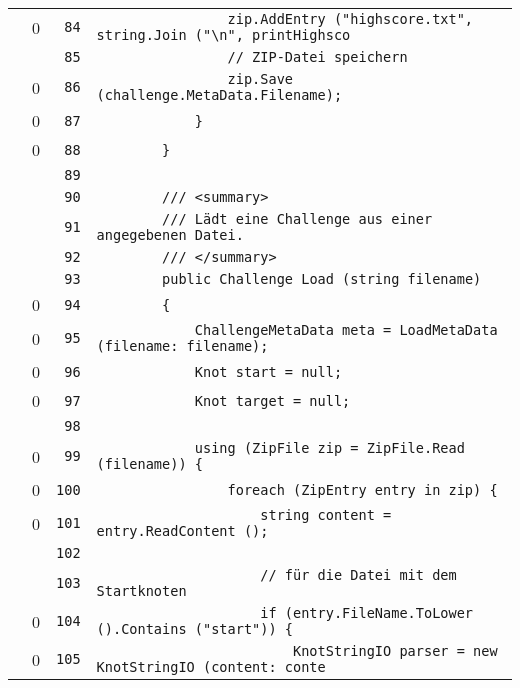 \documentclass[a4paper,10pt]{article}
\begin{document}
\begin{longtable}[l]{lrrl}
\cellcolor{red} & 0 & \verb~84~ & \verb~                zip.AddEntry ("highscore.txt", string.Join ("\n", printHighsco~\\
\cellcolor{gray} &  & \verb~85~ & \verb~                // ZIP-Datei speichern~\\
\cellcolor{red} & 0 & \verb~86~ & \verb~                zip.Save (challenge.MetaData.Filename);~\\
\cellcolor{red} & 0 & \verb~87~ & \verb~            }~\\
\cellcolor{red} & 0 & \verb~88~ & \verb~        }~\\
\cellcolor{gray} &  & \verb~89~ & \verb~~\\
\cellcolor{gray} &  & \verb~90~ & \verb~        /// <summary>~\\
\cellcolor{gray} &  & \verb~91~ & \verb~        /// Lädt eine Challenge aus einer angegebenen Datei.~\\
\cellcolor{gray} &  & \verb~92~ & \verb~        /// </summary>~\\
\cellcolor{gray} &  & \verb~93~ & \verb~        public Challenge Load (string filename)~\\
\cellcolor{red} & 0 & \verb~94~ & \verb~        {~\\
\cellcolor{red} & 0 & \verb~95~ & \verb~            ChallengeMetaData meta = LoadMetaData (filename: filename);~\\
\cellcolor{red} & 0 & \verb~96~ & \verb~            Knot start = null;~\\
\cellcolor{red} & 0 & \verb~97~ & \verb~            Knot target = null;~\\
\cellcolor{gray} &  & \verb~98~ & \verb~~\\
\cellcolor{red} & 0 & \verb~99~ & \verb~            using (ZipFile zip = ZipFile.Read (filename)) {~\\
\cellcolor{red} & 0 & \verb~100~ & \verb~                foreach (ZipEntry entry in zip) {~\\
\cellcolor{red} & 0 & \verb~101~ & \verb~                    string content = entry.ReadContent ();~\\
\cellcolor{gray} &  & \verb~102~ & \verb~~\\
\cellcolor{gray} &  & \verb~103~ & \verb~                    // für die Datei mit dem Startknoten~\\
\cellcolor{red} & 0 & \verb~104~ & \verb~                    if (entry.FileName.ToLower ().Contains ("start")) {~\\
\cellcolor{red} & 0 & \verb~105~ & \verb~                        KnotStringIO parser = new KnotStringIO (content: conte~\\

\end{longtable}
\end{document}
